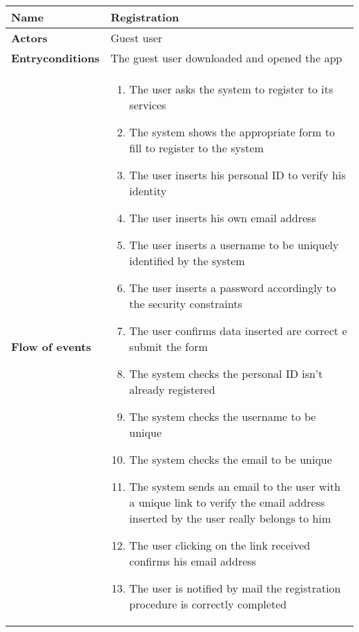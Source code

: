 \begin{longtable}{p{0.25\linewidth}p{0.75\linewidth}}
\toprule
\textbf{Name} & \textbf{Registration} \\
\midrule
\textbf{Actors} & Guest user \\
\midrule
\textbf{Entry\newline conditions} &  The guest user downloaded and opened the app\\
\midrule
\textbf{Flow of events} & 
\begin{enumerate}
	\item The user asks the system to register to its services
	\item The system shows the appropriate form to fill to register to the system
	\item The user inserts his personal ID to verify his identity
	\item The user inserts his own email address
	\item The user inserts a username to be uniquely identified by the system
	\item The user inserts a password accordingly to the security constraints
	\item The user confirms data inserted are correct e submit the form
	\item The system checks the personal ID isn't already registered
	\item The system checks the username to be unique
	\item The system checks the email to be unique
	\item The system sends an email to the user with a unique link to verify the email address inserted by the user really belongs to him
	\item The user clicking on the link received confirms his email address
	\item The user is notified by mail the registration procedure is correctly completed
\end{enumerate} \\

\midrule


\end{longtable}
